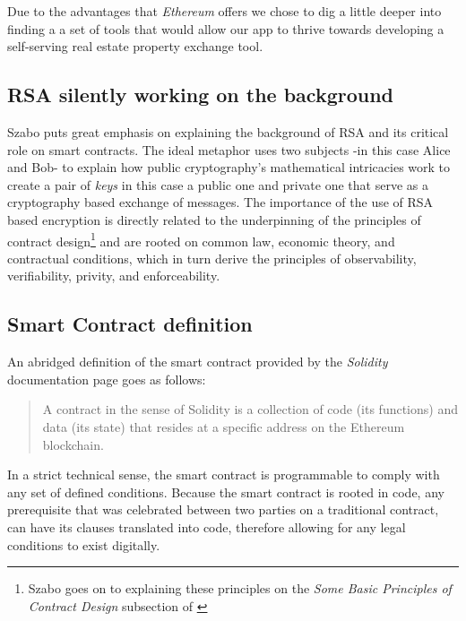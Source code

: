 \documentclass[submission,copyright,creativecommons]{eptcs}
\begin{document}
Due to the advantages that \textit{Ethereum} offers we chose to dig a little deeper into finding a a set of tools that would allow our app to thrive towards developing a self-serving real estate property exchange tool.

\subsection{RSA silently working on the background}
Szabo puts great emphasis on explaining the background of RSA\cite{milanov2009rsa} and its critical role on smart contracts.  The ideal metaphor uses two subjects -in this case Alice and Bob- to explain how public cryptography's mathematical intricacies work to create a pair of \textit{keys} in this case a public one and private one that serve as a cryptography based exchange of messages.  The importance of the use of RSA based encryption is directly related to the underpinning of the principles of contract design\footnote{Szabo goes on to explaining these principles on the \textit{Some Basic Principles of Contract Design} subsection of \cite{NickSzaboSmart}} and are rooted on common law, economic theory, and contractual conditions, which in turn derive the principles of observability, verifiability, privity, and enforceability.

\subsection{Smart Contract definition}
An abridged definition of the smart contract provided by the \textit{Solidity} documentation page goes as follows:
\begin{quote}
    A contract in the sense of Solidity is a collection of code (its functions) and data (its state) that resides at a specific address on the Ethereum blockchain.\cite{IntroductionSmartContracts}
\end{quote}
In a strict technical sense, the smart contract is programmable to comply with any set of defined conditions.  Because the smart contract is rooted in code, any prerequisite that was celebrated between two parties on a traditional contract, can have its clauses translated into code, therefore allowing for any legal conditions to exist digitally.
\end{document}
